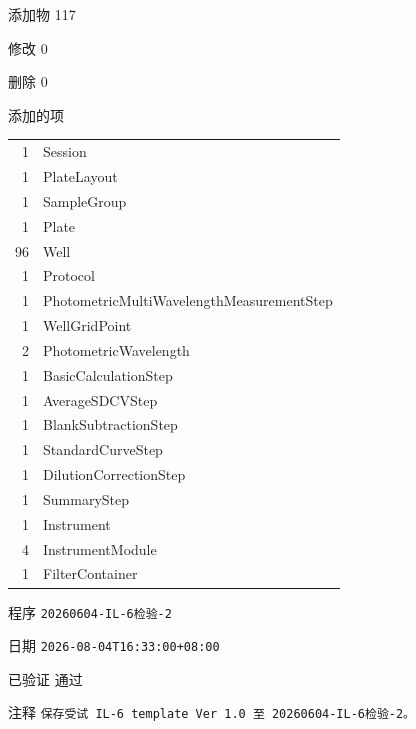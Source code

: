 \documentclass[UTF8,10pt,a4paper,fontset=fandol]{ctexart}
\newcommand{\fieldvalue}[1]{#1}
\begin{document}
\medskip

\noindent
添加物\hspace{2em}
\fieldvalue{117}

\noindent
修改\hspace{2em}
\fieldvalue{0}

\noindent
删除\hspace{2em}
\fieldvalue{0}

\medskip

\noindent
添加的项

\begin{tabular}{r l}
1 & Session\\
1 & PlateLayout\\
1 & SampleGroup\\
1 & Plate\\
96 & Well\\
1 & Protocol\\
1 & PhotometricMultiWavelengthMeasurementStep\\
1 & WellGridPoint\\
2 & PhotometricWavelength\\
1 & BasicCalculationStep\\
1 & AverageSDCVStep\\
1 & BlankSubtractionStep\\
1 & StandardCurveStep\\
1 & DilutionCorrectionStep\\
1 & SummaryStep\\
1 & Instrument\\
4 & InstrumentModule\\
1 & FilterContainer
\end{tabular}

\medskip

\noindent
程序\hspace{2em}
\fieldvalue{\texttt{20260604-IL-6检验-2}}

\noindent
日期\hspace{2em}
\fieldvalue{\texttt{2026-08-04T16:33:00+08:00}}

\noindent
已验证\hspace{2em}
\fieldvalue{通过}

\noindent
注释\hspace{2em}
\fieldvalue{\texttt{保存受试 IL-6 template Ver 1.0 至 20260604-IL-6检验-2。}}
\end{document}
